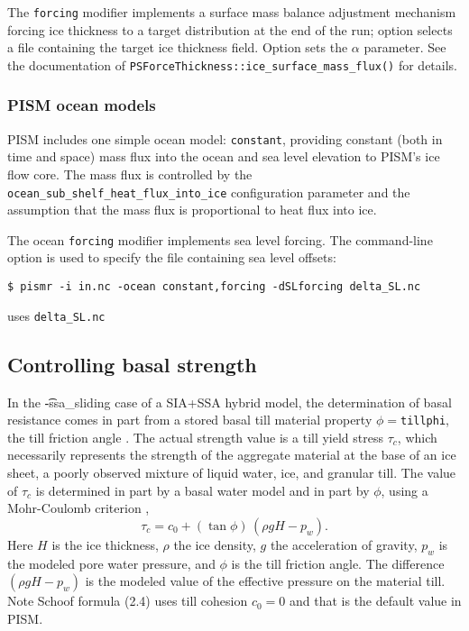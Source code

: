 The \texttt{forcing} modifier implements a surface mass balance adjustment mechanism forcing ice thickness to a target distribution at the end of the run; option  selects a file containing the target ice thickness field. Option  sets the $\alpha$ parameter. See the documentation  of \texttt{PSForceThickness::ice_surface_mass_flux()} for details.

\subsubsection{PISM ocean models}
\label{sec:pism-ocean-models}

PISM includes one simple ocean model: \texttt{constant}, providing constant (both in time and space) mass flux into the ocean and sea level elevation to PISM's ice flow core. The mass flux is controlled by the\\ \texttt{ocean_sub_shelf_heat_flux_into_ice} configuration parameter and the assumption that the mass flux is proportional to heat flux into ice.

  The ocean \texttt{forcing} modifier implements sea level forcing. The command-line option  is used to specify the file containing sea level offsets:
\begin{verbatim}
$ pismr -i in.nc -ocean constant,forcing -dSLforcing delta_SL.nc
\end{verbatim}%
uses \texttt{delta_SL.nc}

\subsection{Controlling basal strength}  \label{subsect:basestrength}

In the \t{-ssa_sliding} case of a SIA+SSA hybrid model, the determination of basal resistance comes in part from a stored basal till material property $\phi=$\texttt{tillphi}, the till friction angle \cite{Paterson}.  The actual strength value is a till yield stress $\tau_c$, which necessarily represents the strength of the aggregate material at the base of an ice sheet, a poorly observed mixture of liquid water, ice, and granular till.  The value of $\tau_c$ is determined in part by a basal water model and in part by $\phi$, using a Mohr-Coulomb criterion \cite[Chapter 8]{Paterson}, 
\begin{equation*}
   \tau_c = c_{0} + (\tan\phi)\,(\rho g H - p_w).
\end{equation*}
Here $H$ is the ice thickness, $\rho$ the ice density, $g$ the acceleration of gravity, $p_w$ is the modeled pore water pressure, and $\phi$ is the till friction angle.  The difference $(\rho g H - p_w)$ is the modeled value of the effective pressure on the material till.  Note Schoof \cite{SchoofStream} formula (2.4) uses till cohesion $c_0 = 0$ and that is the default value in PISM.

